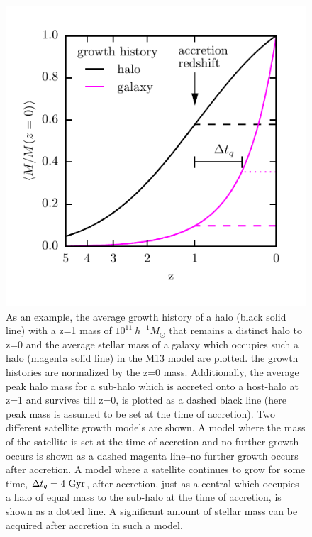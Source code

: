 \documentclass[a4paper,fleqn,usenatbib]{mnras}
\begin{document}
\begin{figure}
    \includegraphics{figures/sat_growth_model.pdf}
    \caption{As an example, the average growth history of a halo (black solid line) with a z=1 mass of $10^{11}~h^{-1}M_{\odot}$ that remains a distinct halo to z=0 and the average stellar mass of a galaxy which occupies such a halo (magenta solid line) in the M13 model are plotted.  the growth histories are normalized by the z=0 mass.  Additionally, the average peak halo mass for a sub-halo which is accreted onto a host-halo at z=1 and survives till z=0, is plotted as a dashed black line (here peak mass is assumed to be set at the time of accretion).  Two different satellite growth models are shown.  A model where the mass of the satellite is set at the time of accretion and no further growth occurs is shown as a dashed magenta line--no further growth occurs after accretion.  A model where a satellite continues to grow for some time, $\Delta t_q = 4 ~{\rm Gyr}$, after accretion, just as a central which occupies a halo of equal mass to the sub-halo at the time of accretion, is shown as a dotted line.  A significant amount of stellar mass can be acquired after accretion in such a model.}
    \label{fig:sat_growth_model}
\end{figure}
\end{document}
